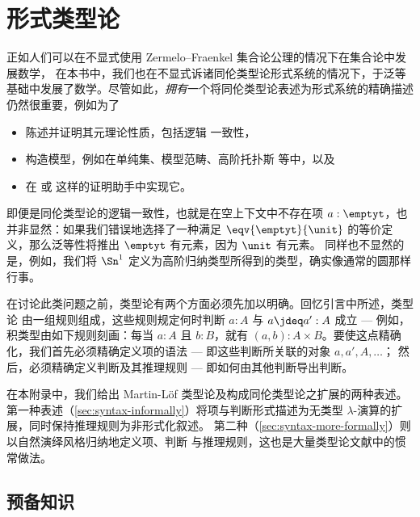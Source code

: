
\chapter{形式类型论}
\label{cha:rules}

%
%
%

正如人们可以在不显式使用 Zermelo--Fraenkel 集合论公理的情况下在集合论中发展数学，
在本书中，我们也在不显式诉诸同伦类型论形式系统的情况下，于泛等基础中发展了数学。尽管如此，\emph{拥有}一个将同伦类型论表述为形式系统的精确描述仍然很重要，例如为了
%
\begin{itemize}
\item 陈述并证明其元理论性质，包括逻辑
一致性，
\item 构造模型，例如在单纯集、模型范畴、高阶托扑斯
等中，以及
\item 在 \Coq 或 \Agda 这样的证明助手中实现它。
\end{itemize}
%
即便是同伦类型论的逻辑一致性，也就是在空上下文中不存在项 $a:\emptyt$，也并非显然：如果我们错误地选择了一种满足 $\eqv{\emptyt}{\unit}$ 的等价定义，那么泛等性将推出 $\emptyt$ 有元素，因为 $\unit$ 有元素。
同样也不显然的是，例如，我们将 $\Sn^1$ 定义为高阶归纳类型所得到的类型，确实像通常的圆那样行事。

在讨论此类问题之前，类型论有两个方面必须先加以明确。回忆引言中所述，类型论
由一组规则组成，这些规则规定何时判断 $a:A$ 与 $a\jdeq a':A$
成立 --- 例如，积类型由如下规则刻画：每当 $a:A$
且 $b:B$，就有 $(a,b):A\times B$。要使这点精确化，我们首先必须精确定义项的语法 --- 即这些判断所关联的对象 $a,a',A,\dots$；
然后，必须精确定义判断及其推理规则 --- 即如何由其他判断导出判断。

在本附录中，我们给出 Martin-L\"{o}f 类型论及构成同伦类型论之扩展的两种表述。
第一种表述（\cref{sec:syntax-informally}）将项与判断形式描述为无类型
$\lambda$-演算的扩展，同时保持推理规则为非形式化叙述。
第二种（\cref{sec:syntax-more-formally}）则以自然演绎风格归纳地定义项、判断
与推理规则，这也是大量类型论文献中的惯常做法。

\section*{预备知识}
\label{sec:formal-prelim}


